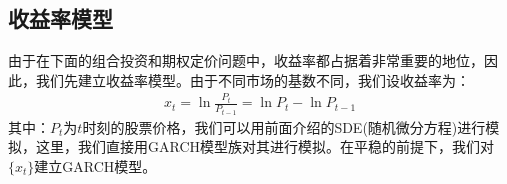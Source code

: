     \subsection{收益率模型}
        \par
        由于在下面的组合投资和期权定价问题中，收益率都占据着非常重要的地位，因此，我们先建立收益率模型。由于不同市场的基数不同，我们设收益率为：
        \begin{align*}
        x_t = \ln \frac{P_t}{P_{t-1}} = \ln P_t -\ln P_{t-1}
        \end{align*}
        其中：$P_t$为$t$时刻的股票价格，我们可以用前面介绍的SDE(随机微分方程)进行模拟，这里，我们直接用GARCH模型族对其进行模拟。在平稳的前提下，我们对 $\{x_t\}$建立GARCH模型。

